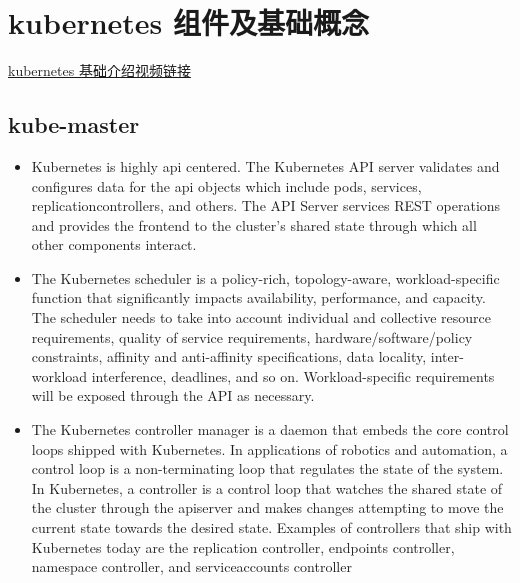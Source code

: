 \section{kubernetes 组件及基础概念}

\href{ https://www.youtube.com/watch?v=_vHTaIJm9uY&list=PLF3s2WICJlqOiymMaTLjwwHz-MSVbtJPQ}{kubernetes 基础介绍视频链接}

\subsection{kube-master}

\begin{itemize}

	\item Kubernetes is highly api centered. The Kubernetes API server validates and configures data for the api objects which include pods, services, replicationcontrollers, and others. The API Server services REST operations and provides the frontend to the cluster’s shared state through which all other components interact.

        \item The Kubernetes scheduler is a policy-rich, topology-aware, workload-specific function that significantly impacts availability, performance, and capacity. The scheduler needs to take into account individual and collective resource requirements, quality of service requirements, hardware/software/policy constraints, affinity and anti-affinity specifications, data locality, inter-workload interference, deadlines, and so on. Workload-specific requirements will be exposed through the API as necessary.

        \item The Kubernetes controller manager is a daemon that embeds the core control loops shipped with Kubernetes. In applications of robotics and automation, a control loop is a non-terminating loop that regulates the state of the system. In Kubernetes, a controller is a control loop that watches the shared state of the cluster through the apiserver and makes changes attempting to move the current state towards the desired state. Examples of controllers that ship with Kubernetes today are the replication controller, endpoints controller, namespace controller, and serviceaccounts controller

\end{itemize}


